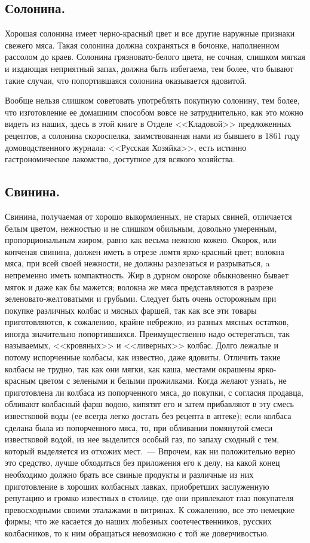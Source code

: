 \subsection{Солонина.}
Хорошая солонина имеет черно-красный цвет и все другие наружные признаки свежего мяса. Такая солонина должна сохраняться в бочонке, наполненном рассолом до краев. Солонина грязновато-белого цвета, не сочная, слишком мягкая и издающая неприятный запах, должна быть избегаема, тем более, что бывают такие случаи, что попортившаяся солонина оказывается ядовитой.

Вообще нельзя слишком советовать употреблять покупную солонину, тем более, что изготовление ее домашним способом вовсе не затруднительно, как это можно видеть из наших, здесь в этой книге в Отделе <<Кладовой>> предложенных рецептов, а солонина скороспелка, заимствованная нами из бывшего в 1861 году домоводственного журнала: <<Русская Хозяйка>>, есть истинно гастрономическое лакомство, доступное для всякого хозяйства.

\subsection{Свинина.}
Свинина, получаемая от хорошо выкормленных, не старых свиней, отличается белым цветом, нежностью и не слишком обильным, довольно умеренным, пропорциональным жиром, равно как весьма нежною кожею. Окорок, или копченая свинина, должен иметь в отрезе ломтя ярко-красный цвет; волокна мяса, при всей своей нежности, не должны разлезаться и разрываться, a непременно иметь компактность. Жир в дурном окороке обыкновенно бывает мягок и даже как бы мажется; волокна же мяса представляются в разрезе зеленовато-желтоватыми и грубыми. Следует быть очень осторожным при покупке различных колбас и мясных фаршей, так как все эти товары приготовляются, к сожалению, крайне небрежно, из разных мясных остатков, иногда значительно попортившихся. Преимущественно надо остерегаться, так называемых, <<кровяных>> и <<ливерных>> колбас. Долго лежалые и потому испорченные колбасы, как известно, даже ядовиты. Отличить такие колбасы не трудно, так как они мягки, как каша, местами окрашены ярко-красным цветом с зелеными и белыми прожилками. Когда желают узнать, не приготовлена ли колбаса из попорченного мяса, до покупки, с согласия продавца, обливают колбасный фарш водою, кипятят его и затем прибавляют в эту смесь известковой воды (ее всегда легко достать без рецепта в аптеке); если колбаса сделана была из попорченного мяса, то, при обливании помянутой смеси известковой водой, из нее выделится особый газ, по запаху сходный с тем, который выделяется из отхожих мест.~--- Впрочем, как ни положительно верно это средство, лучше обходиться без приложения его к делу, на какой конец необходимо должно брать все свиные продукты и различные из них приготовление в хороших колбасных лавках, приобретших заслуженную репутацию и громко известных в столице, где они привлекают глаз покупателя превосходными своими эталажами в витринах. К сожалению, все это немецкие фирмы; что же касается до наших любезных соотечественников, русских колбасников, то к ним обращаться невозможно с той же доверчивостью.

